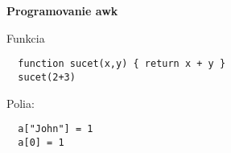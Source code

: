 \documentclass[8pt,landscape]{extarticle}
\newcommand{\Heading}[1]{%
{\begin{center}\bfseries\Large#1\end{center}}%
}%
\newenvironment{karticka}[1]%
{%
\Heading{#1}%
}%
{%
\clearpage
}%
\begin{document}
\begin{karticka}{Programovanie awk}
%
\def\CRLF{\\[3pt]}
%
Funkcia
\begin{middlecolorbox}
\begin{Verbatim}
  function sucet(x,y) { return x + y }
  sucet(2+3)
\end{Verbatim}  
\end{middlecolorbox}

Polia:

\begin{middlecolorbox}
\begin{Verbatim}
  a["John"] = 1
  a[0] = 1
\end{Verbatim}  
\end{middlecolorbox}
\end{karticka}
\end{document}
